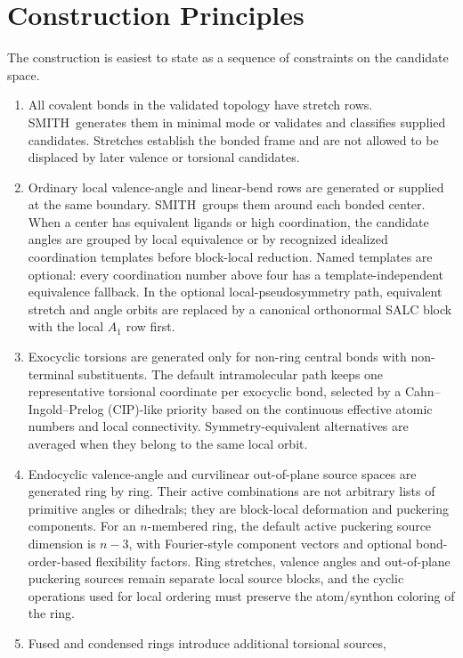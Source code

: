 \documentclass[journal=jctcce,manuscript=article,layout=traditional]{achemso}
\newcommand{\SMITH}{\textsc{SMITH}}
\theoremstyle{definition}
\begin{document}
\section{Construction Principles}

The construction is easiest to state as a sequence of constraints on the
candidate space.

\begin{enumerate}
\item All covalent bonds in the validated topology have stretch rows.
\SMITH\ generates them in minimal mode or validates and classifies supplied candidates.
Stretches establish the bonded frame and are not allowed to be displaced by
later valence or torsional candidates.
\item Ordinary local valence-angle and linear-bend rows are generated or
supplied at the same boundary.  \SMITH\ groups them around each bonded center.
When a center has equivalent ligands or high coordination, the candidate angles
are grouped by local equivalence or by recognized idealized coordination
templates before block-local reduction.  Named templates are optional: every
coordination number above four has a template-independent equivalence fallback.
In the optional local-pseudosymmetry
path, equivalent stretch and angle orbits are replaced by a canonical
orthonormal SALC block with the local \(A_1\) row first.
\item Exocyclic torsions are generated only for non-ring central bonds with
non-terminal substituents.  The default intramolecular path keeps one
representative torsional coordinate per exocyclic bond, selected by a
Cahn--Ingold--Prelog (CIP)-like
priority based on the continuous effective atomic numbers and local
connectivity.  Symmetry-equivalent alternatives are averaged when they belong
to the same local orbit.
\item Endocyclic valence-angle and curvilinear out-of-plane source spaces are generated ring
by ring.  Their active combinations are not arbitrary lists of primitive
angles or dihedrals; they are block-local deformation and puckering components.
For an \(n\)-membered ring, the default active puckering source dimension is
\(n-3\), with Fourier-style component vectors and optional
bond-order-based flexibility factors.  Ring stretches, valence angles and
out-of-plane puckering sources remain separate local source blocks, and the cyclic operations used
for local ordering must preserve the atom/synthon coloring of the ring.
\item Fused and condensed rings introduce additional torsional sources,

\end{enumerate}
\end{document}
